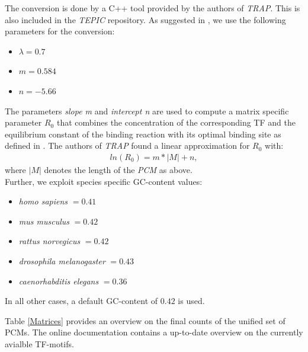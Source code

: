 \documentclass{article}
\begin{document}
The conversion is done by a C++ tool provided by the authors of \textit{TRAP}. This is also included in the \textit{TEPIC} repository.
As suggested in \cite{pmid17098775}, we use the following parameters for the conversion:
\begin{itemize}
\item $\lambda=0.7$
\item $m=0.584$
\item $n=-5.66$
\end{itemize}
The parameters \textit{slope m} and \textit{intercept n} are used to compute a matrix specific parameter $R_0$ that combines the concentration of the corresponding TF and the
equilibrium constant of the binding reaction with its optimal binding site as defined in \cite{pmid17098775}. The authors of \textit{TRAP} found a linear approximation for $R_0$ with:
\begin{align}
ln(R_0)=m*|M|+n,
\end{align}
where $|M|$ denotes the length of the \textit{PCM} as above.
\bigskip
\\Further, we exploit species specific GC-content values:
\begin{itemize}
\item \textit{homo sapiens }$=0.41$
\item \textit{mus musculus }$=0.42$
\item \textit{rattus norvegicus }$=0.42$
\item \textit{drosophila melanogaster }$=0.43$
\item \textit{caenorhabditis elegans }$=0.36$
\end{itemize}
In all other cases, a default GC-content of $0.42$ is used.

Table \ref{Matrices} provides an overview on the final counts of the unified set of PCMs.
The online documentation contains a up-to-date overview on the currently avialble TF-motifs.

\newpage
\mbox{}
\newpage
\end{document}
